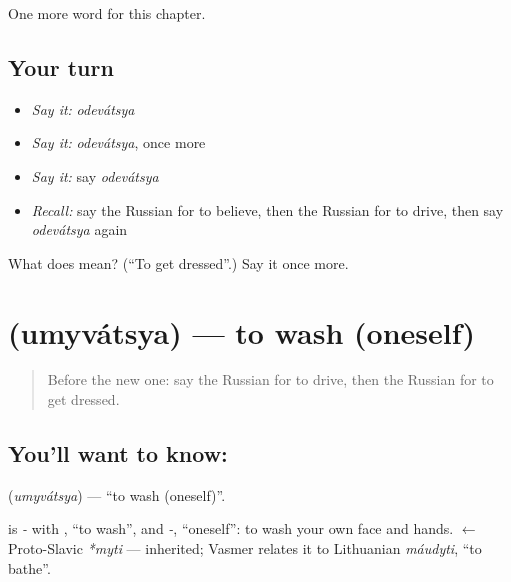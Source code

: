 \begin{grammarlens}[title={What you've built}]
One more word for this chapter.
\end{grammarlens}

\subsection*{Your turn}
\begin{itemize}
\raggedright
  \item \emph{Say it:} \emph{odevátsya}
  \item \emph{Say it:} \emph{odevátsya}, once more
  \item \emph{Say it:} say \emph{odevátsya}
  \item \emph{Recall:} say the Russian for to believe, then the Russian for to drive, then say \emph{odevátsya} again
\end{itemize}

\begin{tcolorbox}[breakable,colback=teal!4,colframe=teal!35!black,title={Before you move on}]
What does  mean? (\textquotedblleft{}To get dressed\textquotedblright{}.) Say it once more.
\end{tcolorbox}
\section[\texorpdfstring{\ru{умываться} (umyvátsya)}{умываться (umyvátsya)}]{ (umyvátsya) — to wash (oneself)}

\label{lesson:RU-C132-to-wash}



\begin{quote}
Before the new one: say the Russian for to drive, then the Russian for to get dressed.
\end{quote}

\subsection*{You'll want to know: }
\textbf{} (\emph{umyvátsya}) — \textquotedblleft{}to wash (oneself)\textquotedblright{}.

\begin{cousinweb}
\textbf{} is \emph{-} with \emph{}, \textquotedblleft{}to wash\textquotedblright{}, and \emph{-}, \textquotedblleft{}oneself\textquotedblright{}: to wash your own face and hands. \emph{} $\leftarrow$ Proto-Slavic \emph{*myti} — inherited; Vasmer relates it to Lithuanian \emph{máudyti}, \textquotedblleft{}to bathe\textquotedblright{}.
\end{cousinweb}

